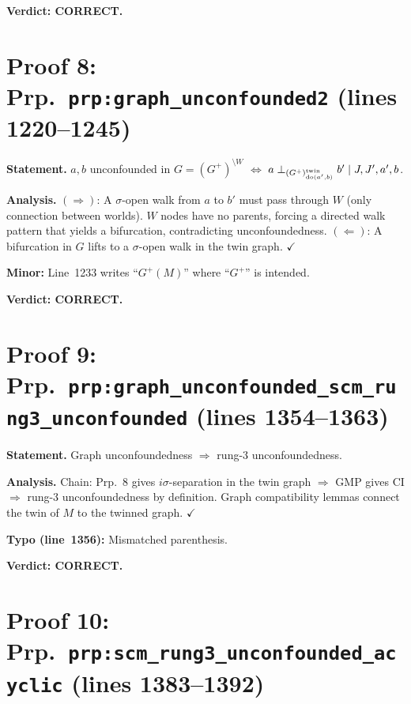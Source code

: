 \documentclass{article}
\begin{document}
\textbf{Verdict: CORRECT.}

\section{Proof 8: Prp.\ \texttt{prp:graph\_unconfounded2} (lines 1220--1245)}

\textbf{Statement.}
$a,b$ unconfounded in $G=(G^+)^{\setminus W}$ $\iff$
$a\perp_{(G^+)^{\mathrm{twin}}_{\operatorname{do}(a',b)}} b'\mid J,J',a',b$.

\textbf{Analysis.}
$(\Rightarrow)$: A $\sigma$-open walk from $a$ to $b'$ must pass through $W$
(only connection between worlds).  $W$ nodes have no parents, forcing a
directed walk pattern that yields a bifurcation, contradicting unconfoundedness.
$(\Leftarrow)$: A bifurcation in $G$ lifts to a $\sigma$-open walk in the
twin graph.  $\checkmark$

\textbf{Minor:} Line~1233 writes ``$G^+(M)$'' where ``$G^+$'' is intended.

\textbf{Verdict: CORRECT.}

\section{Proof 9: Prp.\ \texttt{prp:graph\_unconfounded\_scm\_rung3\_unconfounded}
(lines 1354--1363)}

\textbf{Statement.} Graph unconfoundedness $\Rightarrow$ rung-3 unconfoundedness.

\textbf{Analysis.}
Chain: Prp.~8 gives $i\sigma$-separation in the twin graph $\Rightarrow$
GMP gives CI $\Rightarrow$ rung-3 unconfoundedness by definition.
Graph compatibility lemmas connect the twin of $M$ to the twinned graph.
$\checkmark$

\textbf{Typo (line~1356):} Mismatched parenthesis.

\textbf{Verdict: CORRECT.}

\section{Proof 10: Prp.\ \texttt{prp:scm\_rung3\_unconfounded\_acyclic}
(lines 1383--1392)}
\end{document}
